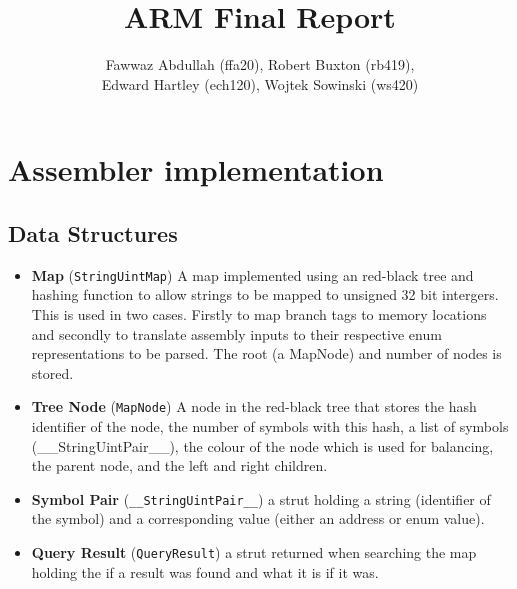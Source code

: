 \documentclass[8pt]{article}
\begin{document}
\title{ARM Final Report}
\author{Fawwaz Abdullah (ffa20), Robert Buxton (rb419), \\Edward Hartley (ech120), Wojtek Sowinski (ws420) }

\maketitle

\section{Assembler implementation}

\subsection{Data Structures}

\begin{itemize}

    \item \textbf{Map} (\texttt{StringUintMap}) A map implemented using an
    red-black tree and hashing function to allow strings to be mapped to unsigned
    32 bit intergers. This is used in two cases. Firstly to map branch tags to 
    memory locations and secondly to translate assembly inputs to their respective
    enum representations to be parsed. The root (a MapNode) and number of nodes is stored.
    
    \item \textbf{Tree Node} (\texttt{MapNode}) A node in the red-black tree that 
    stores the hash identifier of the node, the number of symbols with this hash, 
    a list of symbols (\_\_StringUintPair\_\_), the colour of the node which is used for balancing, the 
    parent node, and the left and right children.

    \item \textbf{Symbol Pair} (\texttt{\_\_StringUintPair\_\_}) a strut holding a
    string (identifier of the symbol) and a corresponding value (either an 
    address or enum value). 

    
    \item \textbf{Query Result} (\texttt{QueryResult}) a strut returned when searching the map
    holding the if a result was found and what it is if it was.
    
\end{itemize}
\end{document}
